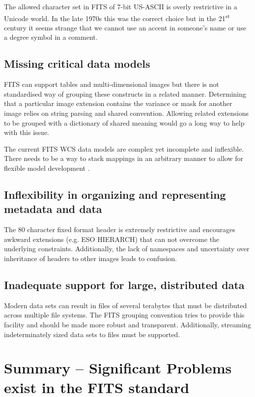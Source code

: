 \documentclass[11pt,twoside]{article}
\begin{document}
The allowed character set in FITS of 7-bit US-ASCII is overly restrictive in a
Unicode world. In the late 1970s this was the correct choice but in the
21\textsuperscript{st} century it seems strange that we cannot use an accent in
someone's name or use a degree symbol in a comment.

\subsection{Missing critical data models}

FITS can support tables and multi-dimensional images but there is not
standardised way of grouping these constructs in a related
manner. Determining that a particular image extension contains the
variance or mask for another image relies on string parsing and shared
convention. Allowing related extensions to be grouped with a
dictionary of shared meaning would go a long way to help with this
issue.

The current FITS WCS data models are complex yet incomplete and
inflexible. There needs to be a way to stack mappings in an arbitrary
manner to allow for flexible model development \citep[see
e.g.][]{O35_adassxxii,1998ASPC..145...41W,2012ASPC..461..825B}.


\subsection{Inflexibility in organizing and representing metadata and
  data}

The 80 character fixed format header is extremely restrictive and
encourages awkward extensions (e.g. ESO HIERARCH) that can not
overcome the underlying constraints. Additionally, the lack of
namespaces and uncertainty over inheritance of headers to other images
leads to confusion.

\subsection{Inadequate support for large, distributed data}

Modern data sets can result in files of several terabytes that must be
distributed across multiple file systems. The FITS grouping convention
tries to provide this facility and should be made more robust and
transparent. Additionally, streaming indeterminately sized data sets
to files must be supported.


\section{Summary -- Significant Problems exist in the FITS standard}
\end{document}
